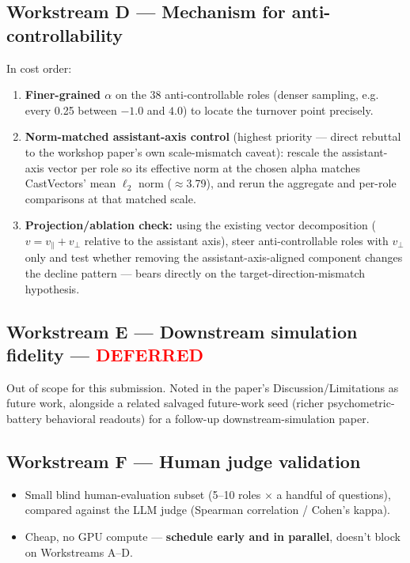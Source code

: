 \documentclass[11pt]{article}
\newcommand{\workstream}[2]{\subsection*{Workstream #1 --- #2}}
\begin{document}
\workstream{D}{Mechanism for anti-controllability}
In cost order:
\begin{enumerate}
  \item \textbf{Finer-grained $\alpha$} on the 38 anti-controllable roles (denser sampling,
    e.g. every 0.25 between $-1.0$ and $4.0$) to locate the turnover point precisely.
  \item \textbf{Norm-matched assistant-axis control} (highest priority --- direct rebuttal
    to the workshop paper's own scale-mismatch caveat): rescale the assistant-axis vector
    per role so its effective norm at the chosen alpha matches CastVectors' mean $\ell_2$
    norm ($\approx$3.79), and rerun the aggregate and per-role comparisons at that matched
    scale.
  \item \textbf{Projection/ablation check:} using the existing vector decomposition
    ($v = v_\parallel + v_\perp$ relative to the assistant axis), steer anti-controllable
    roles with $v_\perp$ only and test whether removing the assistant-axis-aligned
    component changes the decline pattern --- bears directly on the
    target-direction-mismatch hypothesis.
\end{enumerate}

\workstream{E}{Downstream simulation fidelity --- \textcolor{red}{DEFERRED}}
Out of scope for this submission. Noted in the paper's Discussion/Limitations as future
work, alongside a related salvaged future-work seed (richer psychometric-battery
behavioral readouts) for a follow-up downstream-simulation paper.

\workstream{F}{Human judge validation}
\begin{itemize}
  \item Small blind human-evaluation subset (5--10 roles $\times$ a handful of questions),
    compared against the LLM judge (Spearman correlation / Cohen's kappa).
  \item Cheap, no GPU compute --- \textbf{schedule early and in parallel}, doesn't block on
    Workstreams A--D.
\end{itemize}
\end{document}
